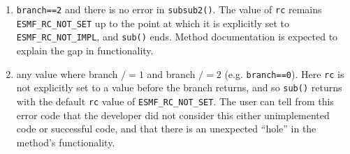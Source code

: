 \begin{enumerate}
\item {\tt branch==2} and there is no error in {\tt subsub2()}. The value of {\tt rc} remains {\tt ESMF\_RC\_NOT\_SET} up to the point at which it is explicitly set to {\tt ESMF\_RC\_NOT\_IMPL}, and {\tt sub()} ends. Method documentation is expected to explain the gap in functionality.

\item any value where branch $/=1$ and branch $/= 2$ (e.g. {\tt branch==0}). Here {\tt rc} is not explicitly set to a value before the branch returns, and so {\tt sub()} returns with the default {\tt rc} value of {\tt ESMF\_RC\_NOT\_SET}. The user can tell from this error code that the developer did not consider this either unimplemented code or successful code, and that there is an unexpected ``hole'' in the method's functionality. 

\end{enumerate}














